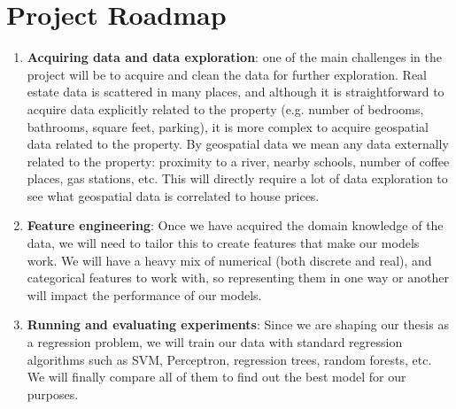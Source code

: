\documentclass{article}
\begin{document}
\section{Project Roadmap}

\begin{enumerate}
    \item \textbf{Acquiring data and data exploration}: one of the main challenges in the project will be to acquire and clean the data for further exploration. Real estate data is scattered in many places, 
    and although it is straightforward to acquire data explicitly related
    to the property (e.g. number of bedrooms, bathrooms, square feet, parking), it
    is more complex to acquire geospatial data related to the property.
    By geospatial data we mean any data externally related to the property:
    proximity to a river, nearby schools, number of coffee places, gas stations, etc. This will directly require a lot of data exploration to see what geospatial data is correlated to house prices.
    \item \textbf{Feature engineering}: Once we have acquired the domain knowledge of the data, we will need to tailor this to create features that make our models work. We will have a heavy mix of numerical (both
    discrete and real), and categorical features to work with, so 
    representing them in one way or another will impact the performance of 
    our models.
    \item \textbf{Running and evaluating experiments}: Since we are shaping 
    our thesis as a regression problem, we will train our data with standard
    regression algorithms such as SVM, Perceptron, regression trees, random
    forests, etc. We will finally compare all of them to find out the best model for our purposes.
\end{enumerate}


\nocite{*}


\end{document}
